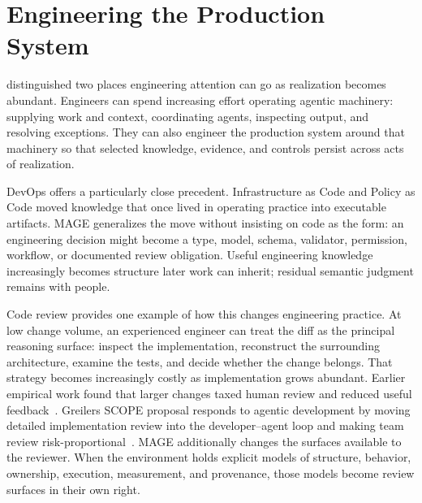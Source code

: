 \section{Engineering the Production System}\label{heading:engineering-the-production-system}


 distinguished two places engineering attention can go as realization becomes abundant. Engineers can spend increasing effort operating agentic machinery: supplying work and context, coordinating agents, inspecting output, and resolving exceptions. They can also engineer the production system around that machinery so that selected knowledge, evidence, and controls persist across acts of realization.

DevOps offers a particularly close precedent. Infrastructure as Code and Policy as Code moved knowledge that once lived in operating practice into executable artifacts. MAGE generalizes the move without insisting on code as the form: an engineering decision might become a type, model, schema, validator, permission, workflow, or documented review obligation. Useful engineering knowledge increasingly becomes structure later work can inherit; residual semantic judgment remains with people.

Code review provides one example of how this changes engineering practice. At low change volume, an experienced engineer can treat the diff as the principal reasoning surface: inspect the implementation, reconstruct the surrounding architecture, examine the tests, and decide whether the change belongs. That strategy becomes increasingly costly as implementation grows abundant. Earlier empirical work found that larger changes taxed human review and reduced useful feedback~\citep{bosu2015useful}. Greiler\textquotesingle s SCOPE proposal responds to agentic development by moving detailed implementation review into the developer--agent loop and making team review risk-proportional~\citep{greiler2026scope}. MAGE additionally changes the surfaces available to the reviewer. When the environment holds explicit models of structure, behavior, ownership, execution, measurement, and provenance, those models become review surfaces in their own right.

